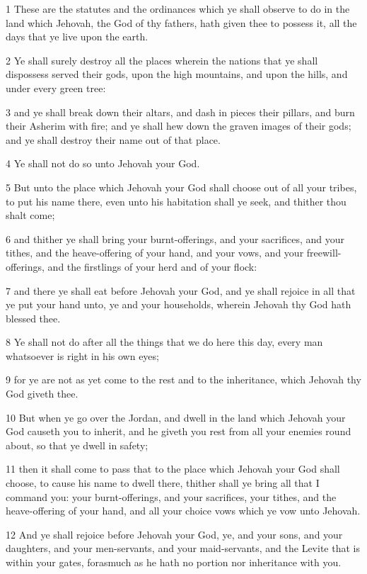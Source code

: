 \par 1 These are the statutes and the ordinances which ye shall observe to do in the land which Jehovah, the God of thy fathers, hath given thee to possess it, all the days that ye live upon the earth.
\par 2 Ye shall surely destroy all the places wherein the nations that ye shall dispossess served their gods, upon the high mountains, and upon the hills, and under every green tree:
\par 3 and ye shall break down their altars, and dash in pieces their pillars, and burn their Asherim with fire; and ye shall hew down the graven images of their gods; and ye shall destroy their name out of that place.
\par 4 Ye shall not do so unto Jehovah your God.
\par 5 But unto the place which Jehovah your God shall choose out of all your tribes, to put his name there, even unto his habitation shall ye seek, and thither thou shalt come;
\par 6 and thither ye shall bring your burnt-offerings, and your sacrifices, and your tithes, and the heave-offering of your hand, and your vows, and your freewill-offerings, and the firstlings of your herd and of your flock:
\par 7 and there ye shall eat before Jehovah your God, and ye shall rejoice in all that ye put your hand unto, ye and your households, wherein Jehovah thy God hath blessed thee.
\par 8 Ye shall not do after all the things that we do here this day, every man whatsoever is right in his own eyes;
\par 9 for ye are not as yet come to the rest and to the inheritance, which Jehovah thy God giveth thee.
\par 10 But when ye go over the Jordan, and dwell in the land which Jehovah your God causeth you to inherit, and he giveth you rest from all your enemies round about, so that ye dwell in safety;
\par 11 then it shall come to pass that to the place which Jehovah your God shall choose, to cause his name to dwell there, thither shall ye bring all that I command you: your burnt-offerings, and your sacrifices, your tithes, and the heave-offering of your hand, and all your choice vows which ye vow unto Jehovah.
\par 12 And ye shall rejoice before Jehovah your God, ye, and your sons, and your daughters, and your men-servants, and your maid-servants, and the Levite that is within your gates, forasmuch as he hath no portion nor inheritance with you.
